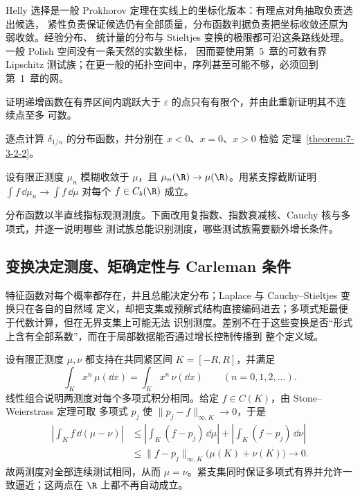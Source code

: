 Helly 选择是一般 Prokhorov 定理在实线上的坐标化版本：有理点对角抽取负责选出候选，
紧性负责保证候选仍有全部质量，分布函数判据负责把坐标收敛还原为弱收敛。经验分布、
统计量的分布与 Stieltjes 变换的极限都可沿这条路线处理。一般 Polish 空间没有一条天然的实数坐标，
因而要使用第~5~章的可数有界 Lipschitz 测试族；在更一般的拓扑空间中，序列甚至可能不够，必须回到
第~1~章的网。

\begin{exercise}
证明递增函数在有界区间内跳跃大于 $\varepsilon$ 的点只有有限个，并由此重新证明其不连续点至多
可数。
\end{exercise}
\begin{exercise}
逐点计算 $\delta_{1/n}$ 的分布函数，并分别在 $x<0$、$x=0$、$x>0$ 检验
定理~\ref{theorem:7-3-2-2}。
\end{exercise}
\begin{exercise}
设有限正测度 $\mu_n$ 模糊收敛于 $\mu$，且 $\mu_n(\R)\to\mu(\R)$。用紧支撑截断证明
$\int f\,\dd\mu_n\to\int f\,\dd\mu$ 对每个 $f\in C_b(\R)$ 成立。
\end{exercise}

分布函数以半直线指标观测测度。下面改用复指数、指数衰减核、Cauchy 核与多项式，并逐一说明哪些
测试族总能识别测度，哪些测试族需要额外增长条件。

\subsection{变换决定测度、矩确定性与 Carleman 条件}\label{subsec:7-3-3}

特征函数对每个概率都存在，并且总能决定分布；Laplace 与 Cauchy--Stieltjes 变换只在各自的自然域
定义，却把支集或预解式结构直接编码进去；多项式矩最便于代数计算，但在无界支集上可能无法
识别测度。差别不在于这些变换是否“形式上含有全部系数”，而在于局部数据能否通过增长控制传播到
整个定义域。

\begin{example}[紧支集确定性]\label{ex:7-3-3-1}
设有限正测度 $\mu,\nu$ 都支持在共同紧区间 $K=[-R,R]$，并满足
\[
 \int_Kx^n\,\mu(\dd x)=\int_Kx^n\,\nu(\dd x)
 \qquad(n=0,1,2,\ldots).
\]
线性组合说明两测度对每个多项式积分相同。给定 $f\in C(K)$，由 Stone--Weierstrass 定理可取
多项式 $p_j$ 使 $\|p_j-f\|_{\infty,K}\to0$，于是
\begin{align*}
 \left|\int_K f\,\dd(\mu-\nu)\right|
 &\leq\left|\int_K(f-p_j)\,\dd\mu\right|
      +\left|\int_K(f-p_j)\,\dd\nu\right|\\
 &\leq\|f-p_j\|_{\infty,K}\bigl(\mu(K)+\nu(K)\bigr)\longrightarrow0.
\end{align*}
故两测度对全部连续测试相同，从而 $\mu=\nu$。紧支集同时保证多项式有界并允许一致逼近；这两点在
$\R$ 上都不再自动成立。
\end{example}


